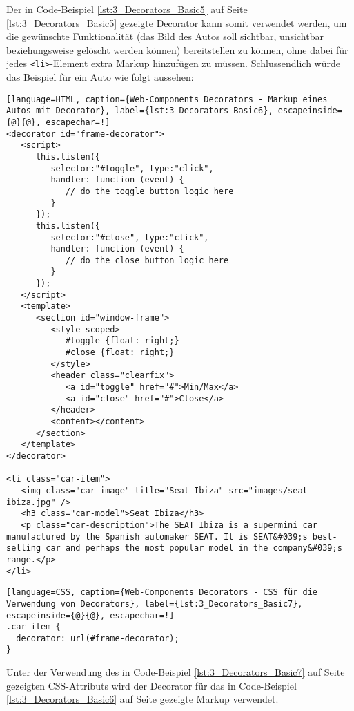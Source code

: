 Der in Code-Beispiel \ref{lst:3_Decorators_Basic5} auf Seite \ref{lst:3_Decorators_Basic5} gezeigte Decorator kann somit verwendet werden, um die gewünschte Funktionalität (das Bild des Autos soll sichtbar, unsichtbar beziehungsweise gelöscht werden können) bereitstellen zu können, ohne dabei für jedes \lstinline|<li>|-Element extra Markup hinzufügen zu müssen. Schlussendlich würde das Beispiel für ein Auto wie folgt aussehen:

\begin{lstlisting}[language=HTML, caption={Web-Components Decorators - Markup eines Autos mit Decorator}, label={lst:3_Decorators_Basic6}, escapeinside={@}{@}, escapechar=!]
<decorator id="frame-decorator">
   <script>
      this.listen({
         selector:"#toggle", type:"click",
         handler: function (event) {
            // do the toggle button logic here
         }
      });
      this.listen({
         selector:"#close", type:"click",
         handler: function (event) {
            // do the close button logic here
         }
      });
   </script>
   <template>
      <section id="window-frame">
         <style scoped>
            #toggle {float: right;}
            #close {float: right;}
         </style>
         <header class="clearfix">
            <a id="toggle" href="#">Min/Max</a>
            <a id="close" href="#">Close</a>
         </header>
         <content></content>
      </section>
   </template>
</decorator>

<li class="car-item">
   <img class="car-image" title="Seat Ibiza" src="images/seat-ibiza.jpg" />
   <h3 class="car-model">Seat Ibiza</h3>
   <p class="car-description">The SEAT Ibiza is a supermini car manufactured by the Spanish automaker SEAT. It is SEAT&#039;s best-selling car and perhaps the most popular model in the company&#039;s range.</p>
</li>
\end{lstlisting}

\begin{lstlisting}[language=CSS, caption={Web-Components Decorators - CSS für die Verwendung von Decorators}, label={lst:3_Decorators_Basic7}, escapeinside={@}{@}, escapechar=!]
.car-item {
  decorator: url(#frame-decorator);
}
\end{lstlisting}

Unter der Verwendung des in Code-Beispiel \ref{lst:3_Decorators_Basic7} auf Seite \pageref{lst:3_Decorators_Basic7} gezeigten CSS-Attributs wird der Decorator für das in Code-Beispiel \ref{lst:3_Decorators_Basic6} auf Seite \pageref{lst:3_Decorators_Basic6} gezeigte Markup verwendet.
